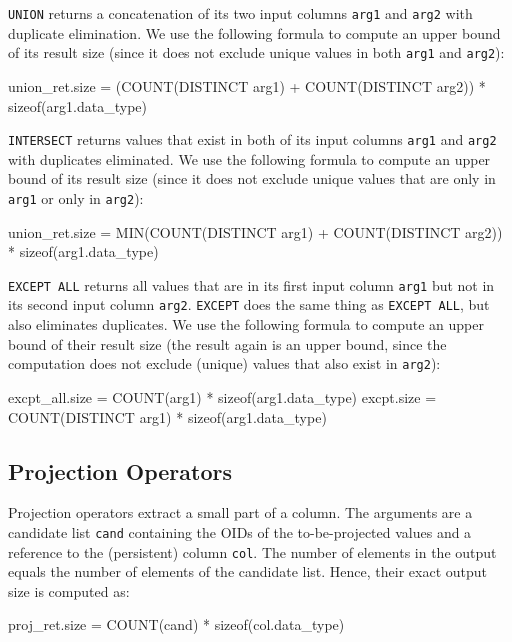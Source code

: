\documentclass[conference]{IEEEtran}
\def\Skip{\par\medskip\nobreak\noindent}
\begin{document}
\texttt{\small UNION} returns a concatenation of its two input columns \texttt{\small arg1} and \texttt{\small arg2} with duplicate elimination.
We use the following formula to compute an upper bound of its result size (since it does not exclude unique values in both \texttt{\small arg1} and \texttt{\small arg2}):
\begin{verb}
union_ret.size = (COUNT(DISTINCT arg1) + 
  COUNT(DISTINCT arg2)) * sizeof(arg1.data_type)
\end{verb}

\texttt{\small INTERSECT} returns values that exist in both of its input columns \texttt{\small arg1} and \texttt{\small arg2} with duplicates eliminated.
We use the following formula to compute an upper bound of its result size (since it does not exclude unique values that are only in \texttt{\small arg1} or only in \texttt{\small arg2}):
\begin{verb}
union_ret.size = MIN(COUNT(DISTINCT arg1) + 
  COUNT(DISTINCT arg2)) * sizeof(arg1.data_type)
\end{verb}

\texttt{\small EXCEPT ALL} returns all values that are in its first input column \texttt{\small arg1} but not in its second input column \texttt{\small arg2}.
\texttt{\small EXCEPT} does the same thing as \texttt{\small EXCEPT ALL}, but also eliminates duplicates.
We use the following formula to compute an upper bound of their result size (the result again is an upper bound, since the computation does not exclude (unique) values that also exist in \texttt{\small arg2}):
\begin{verb}
excpt_all.size = COUNT(arg1) * sizeof(arg1.data_type)
excpt.size = COUNT(DISTINCT arg1) * sizeof(arg1.data_type)
\end{verb}

\subsection{Projection Operators}
Projection operators extract a small part of a column.
The arguments are a candidate list \texttt{\small cand} containing the OIDs of the to-be-projected values and a reference to the (persistent) column \texttt{\small col}.
The number of elements in the output equals the number of elements of the candidate list.%
Hence, their exact output size is computed as:
\begin{verb}
proj_ret.size = COUNT(cand) * sizeof(col.data_type)
\end{verb}
\end{document}
